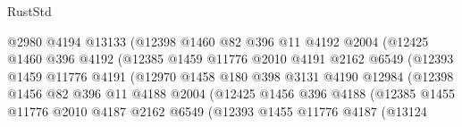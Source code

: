 \begin{lexlean}{RustStd}
\begin{coremodule}
                                @2980
                                @4194
                                @13133
                                (@12398
                                  @1460
                                  @82
                                  @396
                                  @11
                                  @4192
                                  @2004
                                  (@12425
                                    @1460
                                    @396
                                    @4192
                                    (@12385
                                      @1459
                                      @11776
                                      @2010
                                      @4191
                                      @2162
                                      @6549
                                      (@12393
                                        @1459
                                        @11776
                                        @4191
                                        (@12970
                                          @1458
                                          @180
                                          @398
                                          @3131
                                          @4190
                                          @12984
                                          (@12398
                                            @1456
                                            @82
                                            @396
                                            @11
                                            @4188
                                            @2004
                                            (@12425
                                              @1456
                                              @396
                                              @4188
                                              (@12385
                                                @1455
                                                @11776
                                                @2010
                                                @4187
                                                @2162
                                                @6549
                                                (@12393
                                                  @1455
                                                  @11776
                                                  @4187
                                                  (@13124

\end{coremodule}
\end{lexlean}
